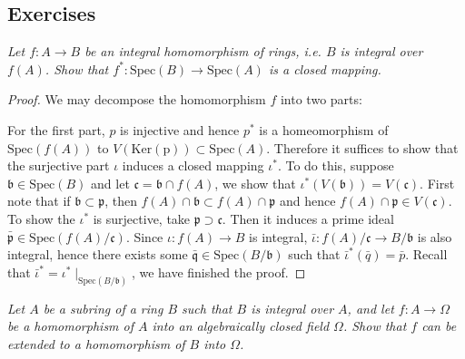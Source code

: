 \subsection{Exercises}
\begin{problem}\em
Let $f:A\to B$ be an integral homomorphism of rings, i.e. $B$ is integral over $f(A)$. Show that $f^*:\mathrm{Spec}(B)\to\mathrm{Spec}(A)$ is a closed mapping.
\end{problem}
\begin{proof}
We may decompose the homomorphism $f$ into two parts: 
\begin{center}
\end{center}
For the first part, $p$ is injective and hence $p^*$ is a homeomorphism of $\mathrm{Spec}(f(A))$ to $V(\mathrm{\mathrm{Ker}(p)})\subset\mathrm{Spec}(A)$. Therefore it suffices to show that the surjective part $\iota$ induces a closed mapping $\iota^*$. To do this, suppose $\mathfrak{b}\in\mathrm{Spec}(B)$ and let $\mathfrak{c}=\mathfrak{b}\cap f(A)$, we show that $\iota^*(V(\mathfrak{b}))=V(\mathfrak{c})$. First note that if $\mathfrak{b}\subset\mathfrak{p}$, then $f(A)\cap\mathfrak{b}\subset f(A)\cap\mathfrak{p}$ and hence $f(A)\cap\mathfrak{p}\in V(\mathfrak{c})$. To show the $\iota^*$ is surjective, take $\mathfrak{p}\supset\mathfrak{c}$. Then it induces a prime ideal $\bar{\mathfrak{p}}\in\mathrm{Spec}(f(A)/\mathfrak{c})$. Since $\iota:f(A)\to B$ is integral, $\bar{\iota}:f(A)/\mathfrak{c}\to B/\mathfrak{b}$ is also integral, hence there exists some $\bar{\mathfrak{q}}\in\mathrm{Spec}(B/\mathfrak{b})$ such that $\bar{\iota}^*(\bar{q})=\bar{p}$. Recall that $\bar{\iota}^*=\iota^*\mid_{\mathrm{Spec}(B/\mathfrak{b})}$, we have finished the proof.
\end{proof}
\begin{problem}\em
Let $A$ be a subring of a ring $B$ such that $B$ is integral over $A$, and let $f:A\to\Omega$ be a homomorphism of $A$ into an algebraically closed field $\Omega$. Show that $f$ can be extended to a homomorphism of $B$ into $\Omega$.
\end{problem}
